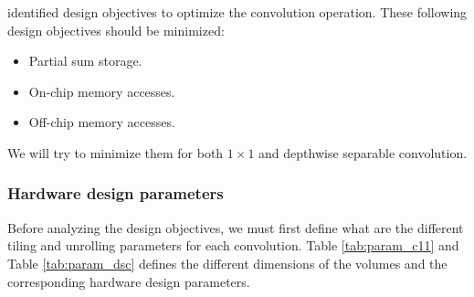 \textcite{ma_optimizing_2018} identified design objectives to optimize the convolution operation. These following design objectives should be minimized:
%
\begin{itemize}
    \item Partial sum storage.
    \item On-chip memory accesses.
    \item Off-chip memory accesses.
\end{itemize}
%
We will try to minimize them for both $1 \times 1$ and depthwise separable convolution.
%
\subsubsection{Hardware design parameters}
%
Before analyzing the design objectives, we must first define what are the different tiling and unrolling parameters for each convolution. Table \ref{tab:param_c11} and Table \ref{tab:param_dsc} defines the different dimensions of the volumes and the corresponding hardware design parameters.


